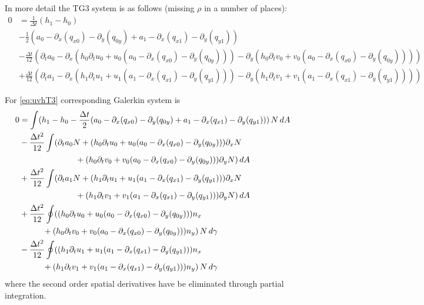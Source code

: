 \documentclass[10pt,a4paper]{book}
\newcommand{\p}{\partial}
\begin{document}
In more detail the TG3 system is as follows (missing $\rho$ in a number of places):
\begin{align}
\label{eq:uvhT3}
0 &= \frac{1}{\Delta t}(h_1-h_0) \\
&- \frac{1}{2} (a_0 -\p_x( q_{x0}) -\p_y ( q_{0y}) + a_1 -\p_x(q_{x1} ) - \p_y(q_{y1}) ) \nonumber \\
&- \frac{\Delta t}{12} (  \p_t a_0 -\p_x ( h_0 \p_t u_0 + u_0 (a_0-\p_x (q_{x0})-\p_y (q_{0y}))) -\p_y ( h_0 \p_t v_0 + v_0 (a_0-\p_x (q_{x0})-\p_y (q_{0y})))) \nonumber \\
&+ \frac{\Delta t}{12} (  \p_t a_1 -\p_x ( h_1 \p_t u_1 + u_1 (a_1-\p_x (q_{x1})-\p_y (q_{y1}))) -\p_y ( h_1 \p_t v_1 + v_1 (a_1-\p_x (q_{x1})-\p_y (q_{y1})))) \nonumber
\end{align}


For \eqref{eq:uvhT3}
corresponding Galerkin system is
\begin{align}
\label{eq:uvhT3G}
0 &=\int( h_1-h_0 - \frac{\Delta t}{2} (a_0 -\p_x( q_{x0}) -\p_y ( q_{0y}) + a_1 -\p_x(q_{x1} ) - \p_y(q_{y1}) ) )\,N\, dA \\
&- \frac{\Delta t^2}{12} \int (  \p_t a_0 N +( h_0 \p_t u_0 + u_0 (a_0-\p_x (q_{x0})-\p_y (q_{0y}))) \p_x N \nonumber \\
&  \hspace{2.4cm} +( h_0 \p_t v_0 + v_0 (a_0-\p_x (q_{x0})-\p_y (q_{0y})))\p_y N )\, dA \nonumber \\
&+ \frac{\Delta t^2}{12} \int (  \p_t a_1 N + ( h_1 \p_t u_1 + u_1 (a_1-\p_x (q_{x1})-\p_y (q_{y1}))) \p_x N \nonumber \\
&  \hspace{2.4cm}  + ( h_1 \p_t v_1 + v_1 (a_1-\p_x (q_{x1})-\p_y (q_{y1})))\p_y N )\, dA \nonumber \\
&+ \frac{\Delta t^2}{12} \oint (( h_0 \p_t u_0 + u_0 (a_0-\p_x (q_{x0})-\p_y (q_{0y}))) n_x \nonumber \\
&  \hspace{1cm} +( h_0 \p_t v_0 + v_0 (a_0-\p_x (q_{x0})-\p_y (q_{0y}))) n_y )\, N \,d\gamma \nonumber \\
&- \frac{\Delta t^2}{12} \oint (( h_1 \p_t u_1 + u_1 (a_1-\p_x (q_{x1})-\p_y (q_{y1}))) n_x  \nonumber \\
&  \hspace{1cm}  + ( h_1 \p_t v_1 + v_1 (a_1-\p_x (q_{x1})-\p_y (q_{y1}))) n_y )\, N \, d\gamma \nonumber
\end{align}
where the second order spatial derivatives have be eliminated through partial integration.
\end{document}
